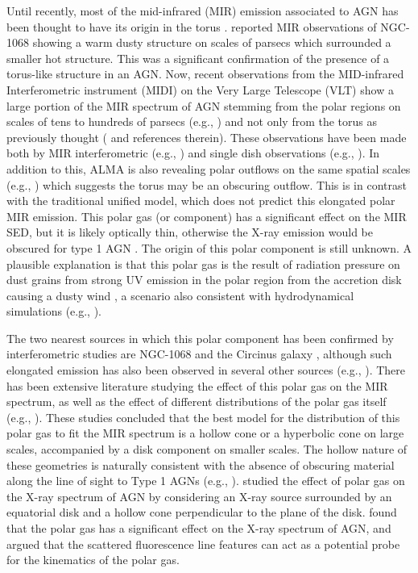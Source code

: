 \documentclass[fleqn,usenatbib]{mnras}
\begin{document}
    Until recently, most of the mid-infrared (MIR) emission associated to AGN has been thought to have its origin in the torus \citep{2008ApJ...685..147N,2012MNRAS.420.2756S}. \citet{Jaffe2004} reported MIR observations of NGC-1068 showing a warm dusty structure on scales of parsecs which surrounded a smaller hot structure. This was a significant confirmation of the presence of a torus-like structure in an AGN. Now, recent observations from the MID-infrared Interferometric instrument (MIDI) on the Very Large Telescope (VLT) show a large portion of the MIR spectrum of AGN stemming from the polar regions on scales of tens to hundreds of parsecs (e.g., \citealp{H_nig_2012}) and not only from the torus as previously thought (\citealp{10.1093/mnras/stx2227, 10.1093/mnras/stz220} and references therein). These observations have been made both by MIR interferometric (e.g., \citealp{2012ApJ...755..149H, 2013A&A...558A.149B, refId03, Leftley_2019}) and single dish observations (e.g., \citealp{Asmus_2016}). In addition to this, ALMA is also revealing polar outflows on the same spatial scales (e.g., \citealp{2016ApJ...829L...7G}) which suggests the torus may be an obscuring outflow. This is in contrast with the traditional unified model, which does not predict this elongated polar MIR emission. This polar gas (or component) has a significant effect on the MIR SED, but it is likely optically thin, otherwise the X-ray emission would be obscured for type 1 AGN \citep{Liu2019XraySO}. The origin of this polar component is still unknown. A plausible explanation is that this polar gas is the result of radiation pressure on dust grains from strong UV emission in the polar region from the accretion disk causing a dusty wind \citep{Ricci2017, Leftley_2019, 2019ApJ...884..171H, 2020ApJ...900..174V}, a scenario also consistent with hydrodynamical simulations (e.g., \citealp{2012ApJ...758...66W}).   

    The two nearest sources in which this polar component has been confirmed by interferometric studies are NGC-1068 \citep{refId01} and the Circinus galaxy \citep{refId02}, although such elongated emission has also been observed in several other sources (e.g., \citealp{refId03, 10.1117/12.2231077}). There has been extensive literature studying the effect of this polar gas on the MIR spectrum, as well as the effect of different distributions of the polar gas itself (e.g., \citealp{10.1093/mnras/stx2227, 10.1093/mnras/stz220, 10.1093/mnras/stz2289}). These studies concluded that the best model for the distribution of this polar gas to fit the MIR spectrum is a hollow cone or a hyperbolic cone on large scales, accompanied by a disk component on smaller scales. The hollow nature of these geometries is naturally consistent with the absence of obscuring material along the line of sight to Type 1 AGNs (e.g., \citealp{Ricci2017, 2017ApJ...850...74K}). \cite{Liu2019XraySO} studied the effect of polar gas on the X-ray spectrum of AGN by considering an X-ray source surrounded by an equatorial disk and a hollow cone perpendicular to the plane of the disk. \cite{Liu2019XraySO} found that the polar gas has a significant effect on the X-ray spectrum of AGN, and argued that the scattered fluorescence line features can act as a potential probe for the kinematics of the polar gas.
\end{document}

